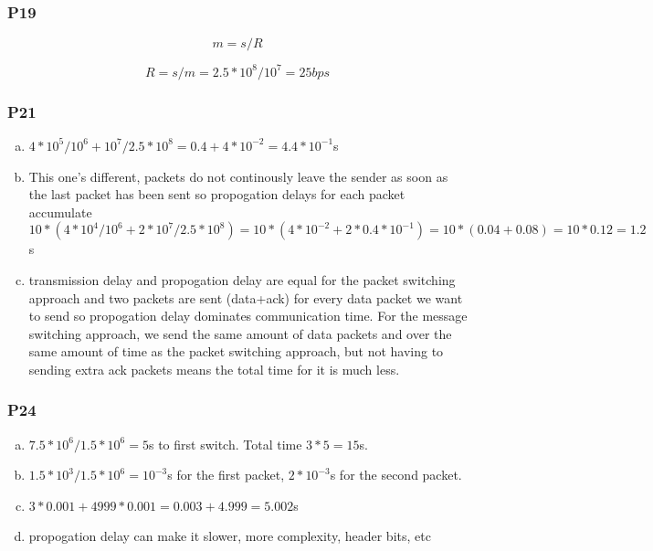 \documentclass[11pt]{article}
\begin{document}
\subsubsection{P19}

$$m = s/R$$

$$R = s/m = 2.5*10^8 / 10^7 = 25bps$$

\subsubsection{P21}

\begin{enumerate}[(a)]
    \item $4*10^5 / 10^6 + 10^7/2.5*10^8 = 0.4 + 4*10^{-2} = 4.4*10^{-1}$s
    \item This one's different, packets do not continously leave the sender as soon as the last packet has been sent so propogation delays for each packet accumulate $10 * (4*10^4 / 10^6 + 2 * 10^7 / 2.5*10^8) = 10 * (4*10^{-2} + 2 * 0.4*10^{-1}) = 10 * (0.04 + 0.08) = 10 * 0.12 = 1.2$s
    \item transmission delay and propogation delay are equal for the packet switching approach and two packets are sent (data+ack) for every data packet we want to send so propogation delay dominates communication time. For the message switching approach, we send the same amount of data packets and over the same amount of time as the packet switching approach, but not having to sending extra ack packets means the total time for it is much less.
\end{enumerate}

\subsubsection{P24}

\begin{enumerate}[(a)]
    \item $7.5*10^6/1.5*10^6 = 5$s to first switch. Total time $3 * 5 = 15$s.
    \item $1.5*10^3/1.5*10^6 = 10^{-3}$s for the first packet, $2 * 10^{-3}$s for the second packet.
    \item $3 * 0.001 + 4999 * 0.001 = 0.003 + 4.999 = 5.002$s
    \item propogation delay can make it slower, more complexity, header bits, etc
\end{enumerate}
\end{document}
